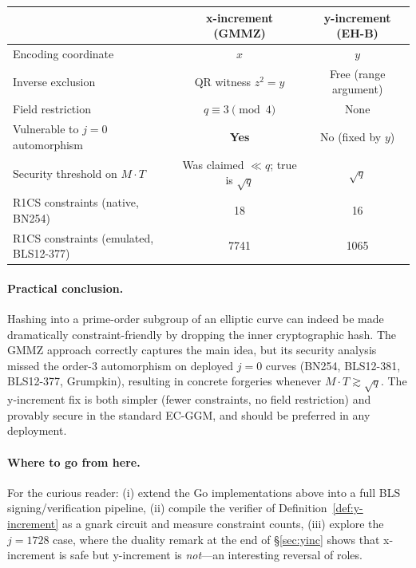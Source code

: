 \documentclass[11pt,a4paper]{article}
\theoremstyle{definition}
\begin{document}
\begin{center}
\begin{tabular}{lcc}
\toprule
 & \textbf{x-increment (GMMZ)} & \textbf{y-increment (EH-B)} \\
\midrule
Encoding coordinate      & $x$ & $y$ \\
Inverse exclusion        & QR witness $z^2 = y$ & Free (range argument) \\
Field restriction        & $q \equiv 3 \pmod 4$ & None \\
Vulnerable to $j=0$ automorphism & \textbf{Yes} & No (fixed by $y$) \\
Security threshold on $M \cdot T$ & Was claimed $\ll q$; true is $\sqrt q$ & $\sqrt q$ \\
R1CS constraints (native, BN254)  & 18 & 16 \\
R1CS constraints (emulated, BLS12-377) & 7741 & 1065 \\
\bottomrule
\end{tabular}
\end{center}

\paragraph{Practical conclusion.}
Hashing into a prime-order subgroup of an elliptic curve can indeed be made
dramatically constraint-friendly by dropping the inner cryptographic hash.
The GMMZ approach correctly captures the main idea, but its security analysis
missed the order-3 automorphism on deployed $j=0$ curves (BN254, BLS12-381,
BLS12-377, Grumpkin), resulting in concrete forgeries whenever $M \cdot T
\gtrsim \sqrt q$. The y-increment fix is both simpler (fewer constraints,
no field restriction) and provably secure in the standard EC-GGM, and should
be preferred in any deployment.

\paragraph{Where to go from here.}
For the curious reader: (i) extend the Go implementations above into a full
BLS signing/verification pipeline, (ii) compile the verifier of
Definition~\ref{def:y-increment} as a gnark circuit and measure constraint
counts, (iii) explore the $j = 1728$ case, where the duality
remark at the end of \S\ref{sec:yinc} shows that x-increment is safe but
y-increment is \emph{not}---an interesting reversal of roles.
\end{document}
